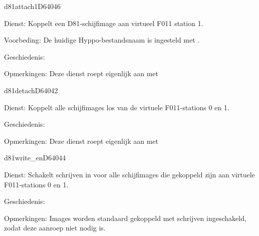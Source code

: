 \begin{hyppotrap}{d81attach1}{D640}{46}

\item [Dienst:]  Koppelt een D81-schijfimage aan virtueel F011 station 1.
\item [Voorbeding:]  De huidige Hyppo-bestandsnaam is ingesteld met .
\item [Geschiedenis:]
  \\

  \item [Opmerkingen:]  Deze dienst roept eigenlijk  aan met 
\end{hyppotrap}


\begin{hyppotrap}{d81detach}{D640}{42}

\item [Dienst:]  Koppelt alle schijfimages los van de virtuele F011-stations 0 en 1.
\item [Geschiedenis:]
  \\

  \item [Opmerkingen:]  Deze dienst roept eigenlijk  aan met 
\end{hyppotrap}


%
\begin{hyppotrap}{d81write\_en}{D640}{44}

\item [Dienst:]  Schakelt schrijven in voor alle schijfimages die gekoppeld zijn aan virtuele F011-stations 0 en 1.
\item [Geschiedenis:]
\item [Opmerkingen:]  Images worden standaard gekoppeld met schrijven ingeschakeld, zodat deze aanroep niet nodig is.
\end{hyppotrap}




